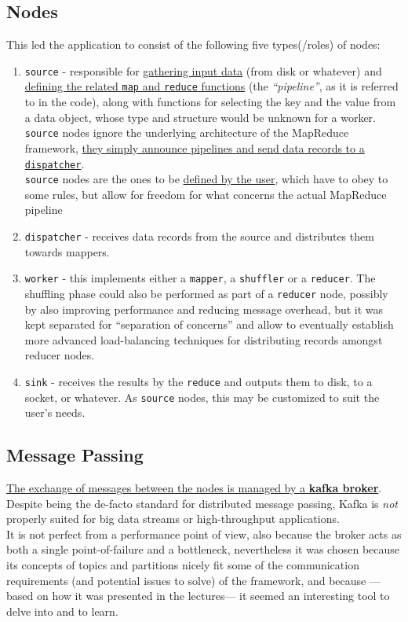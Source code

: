 \subsection{Nodes}
This led the application to consist of the following five types(/roles) of nodes:
\begin{enumerate}
   \item \texttt{source} - responsible for \ul{gathering input data} (from disk or whatever) and \ul{defining the related \texttt{map} and \texttt{reduce} functions} (the \textit{``pipeline''}, as it is referred to in the code), along with functions for selecting the key and the value from a data object, whose type and structure would be unknown for a worker.\\
   \texttt{source} nodes ignore the underlying architecture of the MapReduce framework, \ul{they simply announce pipelines and send data records to a \texttt{dispatcher}}.\\
   \texttt{source} nodes are the ones to be \ul{defined by the user}, which have to obey to some rules, but allow for freedom for what concerns the actual MapReduce pipeline
   \item \texttt{dispatcher} - receives data records from the source and distributes them towards mappers.
   \item \texttt{worker} - this implements either a \texttt{mapper}, a \texttt{shuffler} or a \texttt{reducer}. The shuffling phase could also be performed as part of a \texttt{reducer} node, possibly by also improving performance and reducing message overhead, but it was kept separated for ``separation of concerns'' and allow to eventually establish more advanced load-balancing techniques for distributing records amongst reducer nodes.
   \item \texttt{sink} - receives the results by the \texttt{reduce} and outputs them to disk, to a socket, or whatever. As \texttt{source} nodes, this may be customized to suit the user's needs.
\end{enumerate}

\subsection{Message Passing}
\ul{The exchange of messages between the nodes is managed by a \textbf{kafka broker}}. 
Despite being the de-facto standard for distributed message passing, Kafka is \textit{not} properly suited for big data streams or high-throughput applications.\\
It is not perfect from a performance point of view, also because the broker acts as both a single point-of-failure and a bottleneck, nevertheless it was chosen because its concepts of topics and partitions nicely fit some of the communication requirements (and potential issues to solve) of the framework, and because ---based on how it was presented in the lectures--- it seemed an interesting tool to delve into and to learn.

